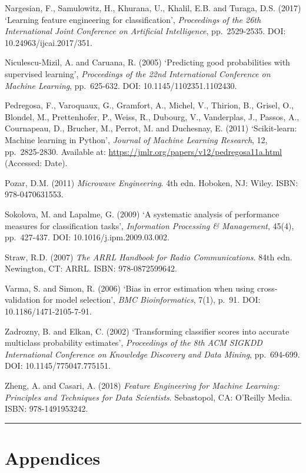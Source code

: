 Nargesian, F., Samulowitz, H., Khurana, U., Khalil, E.B. and Turaga,
D.S. (2017) `Learning feature engineering for classification',
\emph{Proceedings of the 26th International Joint Conference on
Artificial Intelligence}, pp.~2529-2535. DOI: 10.24963/ijcai.2017/351.

Niculescu-Mizil, A. and Caruana, R. (2005) `Predicting good
probabilities with supervised learning', \emph{Proceedings of the 22nd
International Conference on Machine Learning}, pp.~625-632. DOI:
10.1145/1102351.1102430.

Pedregosa, F., Varoquaux, G., Gramfort, A., Michel, V., Thirion, B.,
Grisel, O., Blondel, M., Prettenhofer, P., Weiss, R., Dubourg, V.,
Vanderplas, J., Passos, A., Cournapeau, D., Brucher, M., Perrot, M. and
Duchesnay, E. (2011) `Scikit-learn: Machine learning in Python',
\emph{Journal of Machine Learning Research}, 12, pp.~2825-2830.
Available at: \url{https://jmlr.org/papers/v12/pedregosa11a.html}
(Accessed: Date).

Pozar, D.M. (2011) \emph{Microwave Engineering}. 4th edn. Hoboken, NJ:
Wiley. ISBN: 978-0470631553.

Sokolova, M. and Lapalme, G. (2009) `A systematic analysis of
performance measures for classification tasks', \emph{Information
Processing \& Management}, 45(4), pp.~427-437. DOI:
10.1016/j.ipm.2009.03.002.

Straw, R.D. (2007) \emph{The ARRL Handbook for Radio Communications}.
84th edn. Newington, CT: ARRL. ISBN: 978-0872599642.

Varma, S. and Simon, R. (2006) `Bias in error estimation when using
cross-validation for model selection', \emph{BMC Bioinformatics}, 7(1),
p.~91. DOI: 10.1186/1471-2105-7-91.

Zadrozny, B. and Elkan, C. (2002) `Transforming classifier scores into
accurate multiclass probability estimates', \emph{Proceedings of the 8th
ACM SIGKDD International Conference on Knowledge Discovery and Data
Mining}, pp.~694-699. DOI: 10.1145/775047.775151.

Zheng, A. and Casari, A. (2018) \emph{Feature Engineering for Machine
Learning: Principles and Techniques for Data Scientists}. Sebastopol,
CA: O'Reilly Media. ISBN: 978-1491953242.

\begin{center}\rule{0.5\linewidth}{0.5pt}\end{center}

\section{Appendices}\label{appendices}

